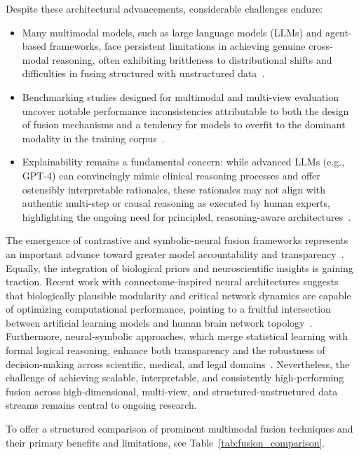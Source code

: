Despite these architectural advancements, considerable challenges endure:
\begin{itemize}
    \item Many multimodal models, such as large language models (LLMs) and agent-based frameworks, face persistent limitations in achieving genuine cross-modal reasoning, often exhibiting brittleness to distributional shifts and difficulties in fusing structured with unstructured data~\cite{ref36,ref46,ref49,ref60,ref74,ref90}.
    \item Benchmarking studies designed for multimodal and multi-view evaluation uncover notable performance inconsistencies attributable to both the design of fusion mechanisms and a tendency for models to overfit to the dominant modality in the training corpus~\cite{ref31,ref74,ref80,ref87,ref88}.
    \item Explainability remains a fundamental concern: while advanced LLMs (e.g., GPT-4) can convincingly mimic clinical reasoning processes and offer ostensibly interpretable rationales, these rationales may not align with authentic multi-step or causal reasoning as executed by human experts, highlighting the ongoing need for principled, reasoning-aware architectures~\cite{ref31,ref36,ref49,ref55,ref89}.
\end{itemize}

The emergence of contrastive and symbolic-neural fusion frameworks represents an important advance toward greater model accountability and transparency~\cite{ref46,ref47,ref48,ref50,ref88}. Equally, the integration of biological priors and neuroscientific insights is gaining traction. Recent work with connectome-inspired neural architectures suggests that biologically plausible modularity and critical network dynamics are capable of optimizing computational performance, pointing to a fruitful intersection between artificial learning models and human brain network topology~\cite{ref90}. Furthermore, neural-symbolic approaches, which merge statistical learning with formal logical reasoning, enhance both transparency and the robustness of decision-making across scientific, medical, and legal domains~\cite{ref46,ref47,ref48,ref49,ref50}. Nevertheless, the challenge of achieving scalable, interpretable, and consistently high-performing fusion across high-dimensional, multi-view, and structured-unstructured data streams remains central to ongoing research.

To offer a structured comparison of prominent multimodal fusion techniques and their primary benefits and limitations, see Table~\ref{tab:fusion_comparison}.

